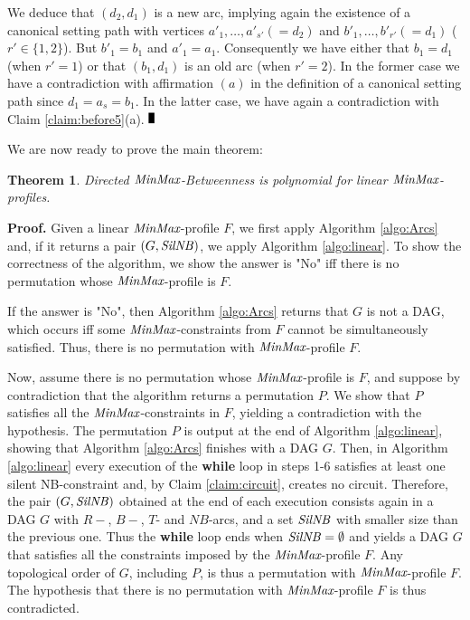 \documentclass{article}
\newcommand{\M}{\mbox{\it MinMax}}
\newcommand{\Sil}{{\it SilNB}}
\newtheorem{thm}{Theorem}
\renewcommand{\Box}{\rule{1.5mm}{3mm}}
\begin{document}
We deduce that $(d_2,d_1)$ is a new arc, implying again the existence of a canonical setting path
with vertices $a'_1, \ldots, a'_{s'}(=d_2)$ and $b'_1, \ldots, b'_{r'} (=d_1)$  ($r'\in\{1,2\}$).
But $b'_1=b_1$ and $a'_1=a_1$. Consequently  we have either that $b_1=d_1$ (when $r'=1$) or
 that $(b_1,d_1)$ is an old arc (when $r'=2$). In the former case we have a contradiction
with affirmation $(a)$ in the definition of a canonical setting path since $d_1=a_s=b_1$. In the latter case, we have again a contradiction with Claim \ref{claim:before5}(a). $\Box$
\bigskip

We are now ready to prove the main theorem:
 
 \begin{thm}
 {\sc Directed $\M$-Betweenness} is polynomial for linear $\M$-profiles.
 \end{thm}

{\bf Proof.} Given a linear $\M$-profile $F$, we first apply Algorithm \ref{algo:Arcs} and,
if it returns a pair $(G,\Sil)$, we apply Algorithm \ref{algo:linear}. To  show the correctness
of the algorithm, we show the answer is "No" iff there is no permutation whose $\M$-profile is $F$.

If the answer is "No", then Algorithm \ref{algo:Arcs} returns that $G$ is not a DAG, which occurs
iff some $\M$-constraints from $F$ cannot be simultaneously satisfied. Thus, there is no permutation 
with $\M$-profile $F$.

Now, assume there is no permutation whose $\M$-profile is $F$, and suppose by contradiction that
the algorithm returns a permutation $P$. We show that $P$ satisfies all the $\M$-constraints in $F$, 
yielding a contradiction with the hypothesis. The permutation $P$ is output at the end of Algorithm \ref{algo:linear},
showing that Algorithm \ref{algo:Arcs} finishes with a DAG $G$. 
Then, in
Algorithm \ref{algo:linear} every execution of the {\bf while} loop in steps 1-6 satisfies at least
one silent NB-constraint and, by Claim \ref{claim:circuit}, creates no circuit. Therefore, 
the pair $(G,\Sil)$ obtained at the end of each execution consists again in a DAG $G$ 
with $R-$, $B-$, $T$- and $NB$-arcs, and a set $\Sil$ with smaller size than the previous one.
Thus the {\bf while} loop ends when $\Sil=\emptyset$ and yields a DAG $G$ that satisfies
all the constraints imposed by the $\M$-profile $F$. Any topological order of $G$, including $P$, is thus
a permutation with $\M$-profile $F$. The hypothesis that there is no permutation with
$\M$-profile $F$ is thus contradicted.
\end{document}
